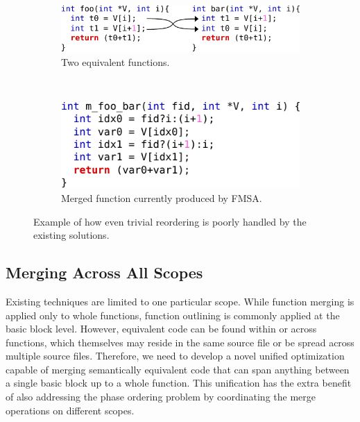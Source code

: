 \begin{figure}[h]
 \centering
 \begin{subfigure}{.75\textwidth}
         \centering
         \includegraphics[scale=1]{src/conclusion/figs/motivation-1-code.pdf}
         \caption{Two equivalent functions.}
         \label{fig:code-reordering}
 \end{subfigure}
 \\
 \begin{subfigure}{.75\textwidth}
         \centering
         \includegraphics[scale=1]{src/conclusion/figs/motivation-1-merged-code.pdf}
         \caption{Merged function currently produced by FMSA.}
         \label{fig:merged-code-reordering}
 \end{subfigure}
    \vspace{-2ex}
    \caption{Example of how even trivial reordering is poorly handled by the existing solutions.}
    \label{fig:code-reordering-example}
\end{figure}

\subsection{Merging Across All Scopes}

Existing techniques are limited to one particular scope.
While function merging is applied only to whole functions,
function outlining is commonly applied at the basic block level.
However, equivalent code can be found within or across functions, which themselves may reside in the same source file or be spread across multiple source files.
Therefore, we need to develop a novel unified optimization capable of merging semantically equivalent code that can span anything between a single basic block up to a whole function.
This unification has the extra benefit of also addressing the phase ordering problem by coordinating the merge operations on different scopes.

